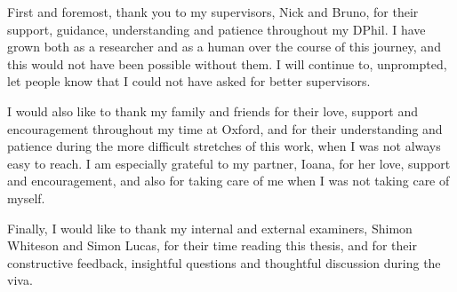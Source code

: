 First and foremost, thank you to my supervisors, Nick and Bruno, for their support, guidance, understanding and patience throughout my DPhil. I have grown both as a researcher and as a human over the course of this journey, and this would not have been possible without them. I will continue to, unprompted, let people know that I could not have asked for better supervisors.

I would also like to thank my family and friends for their love, support and encouragement throughout my time at Oxford, and for their understanding and patience during the more difficult stretches of this work, when I was not always easy to reach. I am especially grateful to my partner, Ioana, for her love, support and encouragement, and also for taking care of me when I was not taking care of myself.

Finally, I would like to thank my internal and external examiners, Shimon Whiteson and Simon Lucas, for their time reading this thesis, and for their constructive feedback, insightful questions and thoughtful discussion during the viva.